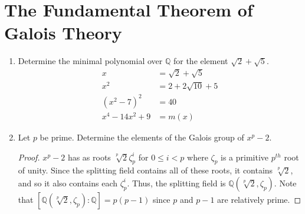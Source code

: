 \documentclass{report}
\newcommand{\Q}{\mathbb{Q}}
\begin{document}
\section{The Fundamental Theorem of Galois Theory}
\begin{enumerate} 
	\item Determine the minimal polynomial over $\Q$ for the element $\sqrt{2}+\sqrt{5}$.
		\begin{align*}
			x &= \sqrt{2}+\sqrt{5} \\
			x^2 &= 2 + 2\sqrt{10} + 5 \\
			(x^2-7)^2 &= 40 \\
			x^4-14x^2+9 &= m(x)
		\end{align*}
		\setcounter{enumi}{3}
	\item Let $p$ be prime. Determine the elements of the Galois group of $x^p-2$.
		\begin{proof}
			$x^p-2$ has as roots $\sqrt[p]{2}\zeta_p^i$ for $0\leq i<p$ where $\zeta_p$ is a primitive $p^{th}$ root of unity.
			Since the splitting field contains all of these roots, it contains $\sqrt[p]{2}$, and so it also contains each $\zeta_p^i$.
			Thus, the splitting field is $\Q(\sqrt[p]{2},\zeta_p)$. Note that $[\Q(\sqrt[p]{2},\zeta_p):\Q]=p(p-1)$ since $p$ and $p-1$ are relatively prime.
			\newline


\end{proof}
\end{enumerate}
\end{document}
